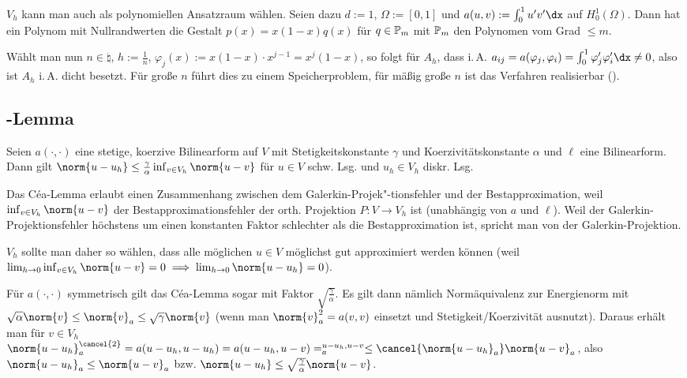 \linie

\begin{Bsp}
    $V_h$ kann man auch als polynomiellen Ansatzraum wählen.
    Seien dazu $d := 1$, $\Omega := [0, 1]$ und
    $a(u, v) := \int_0^1 u'v' \dx$ auf $H^1_0(\Omega)$.
    Dann hat ein Polynom mit Nullrandwerten die Gestalt $p(x) = x(1-x)q(x)$ für $q \in \mathbb{P}_m$
    mit $\mathbb{P}_m$ den Polynomen vom Grad $\le m$.

    Wählt man nun $n \in \natural$, $h := \frac{1}{n}$,
    $\varphi_j(x) := x(1-x) \cdot x^{j-1} = x^j (1-x)$, so folgt für $A_h$, dass i.\,A.
    $a_{ij} = a(\varphi_j, \varphi_i) = \int_0^1 \varphi_j' \varphi_i' \dx \not= 0$,
    also ist $A_h$ i.\,A. dicht besetzt.
    Für große $n$ führt dies zu einem Speicherproblem,
    für mäßig große $n$ ist das Verfahren realisierbar ().
\end{Bsp}

\subsection{%
    -Lemma%
}

\begin{Lemma}{}
    Seien $a(\cdot, \cdot)$ eine stetige, koerzive Bilinearform auf $V$ mit
    Stetigkeitskonstante $\gamma$ und Koerzivitätskonstante $\alpha$
    und $\ell$ eine Bilinearform.\\
    Dann gilt $\norm{u - u_h} \le \frac{\gamma}{\alpha} \inf_{v \in V_h} \norm{u - v}$
    für $u \in V$ schw. Lsg. und $u_h \in V_h$ diskr. Lsg.
\end{Lemma}

\linie

\begin{Bem}
    Das Céa-Lemma erlaubt einen Zusammenhang zwischen dem Galerkin-Projek"-tionsfehler und
    der Bestapproximation, weil $\inf_{v \in V_h} \norm{u - v}$ der Bestapproximationsfehler
    der orth. Projektion $P\colon V \to V_h$ ist (unabhängig von $a$ und $\ell$).
    Weil der Galerkin-Projektionsfehler höchstens um einen konstanten Faktor schlechter als
    die Bestapproximation ist, spricht man von  der Galerkin-Projektion.

    $V_h$ sollte man daher so wählen,
    dass alle möglichen $u \in V$ möglichst gut approximiert werden können
    (weil $\lim_{h \to 0} \inf_{v \in V_h} \norm{u - v} = 0 \implies
    \lim_{h \to 0} \norm{u - u_h} = 0$).

    Für $a(\cdot, \cdot)$ symmetrisch gilt das Céa-Lemma sogar mit Faktor
    $\sqrt{\frac{\gamma}{\alpha}}$.
    Es gilt dann nämlich Normäquivalenz zur Energienorm mit
    $\sqrt{\alpha} \norm{v} \le \norm{v}_a \le \sqrt{\gamma} \norm{v}$
    (wenn man $\norm{v}_a^2 = a(v, v)$ einsetzt und Stetigkeit/Koerzivität ausnutzt).
    Daraus erhält man für $v \in V_h$\\
    $\norm{u - u_h}_a^{\cancel{2}} = a(u - u_h, u - u_h) = a(u - u_h, u - v) =
    \sp{u - u_h, u - v}_a \le \cancel{\norm{u - u_h}_a} \norm{u - v}_a$,
    also $\norm{u - u_h}_a \le \norm{u - v}_a$ bzw.
    $\norm{u - u_h} \le \sqrt{\frac{\gamma}{\alpha}} \norm{u - v}$.
\end{Bem}

